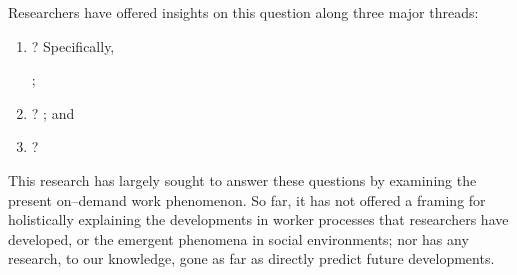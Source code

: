 \documentclass[trackingWork]{subfiles}
\begin{document}
Researchers have offered insights on this question along three major threads:
\begin{enumerate}
  \item {}?
        Specifically,
        \cite{foundry,suzukiAtelier,KimStoria,yuanAlmost,YuEncouragingOutside,
              Nebeling:2016:WCW:2858036.2858169,
              Hahn:2016:KAB:2858036.2858364};
  \item {}?
        \cite{embracingErrorKrishna,bernsteinSoylent,sensitiveTasks,
              LykourentzouPersonalityMatters,KucherbaevReLauncher,
              Law:2016:CKC:2858036.2858144,Cai:2016:CRI:2858036.2858237,
              Chang:2016:ACC:2858036.2858411,Newell:2016:OMA:2858036.2858490}; and%
  \item {}?
        \cite{turkopticon,storiesIraniSilberman,dynamo,crowdcollab,
              whyWouldAnyoneBrewer,takingAHITMcInnis}
\end{enumerate}
This research has largely sought to answer these questions by examining the present on--demand work phenomenon.
So far, it has not offered a framing for holistically explaining
the developments in worker processes that researchers have developed, or
the emergent phenomena in social environments;
nor has any research, to our knowledge,
gone as far as directly predict future developments.
\end{document}
